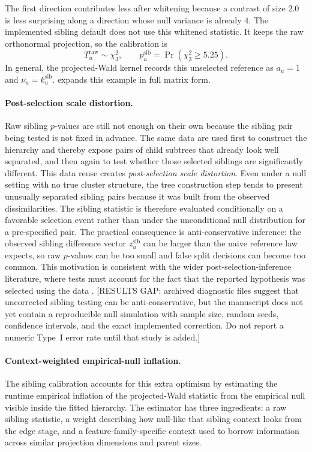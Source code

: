 The first direction contributes less after whitening because a contrast of
size $2.0$ is less surprising along a direction whose null variance is already
$4$. The implemented sibling default does not use this whitened statistic. It
keeps the raw orthonormal projection, so the calibration is
\begin{equation}
T_u^{\mathrm{raw}} \sim \chi^2_3,
\qquad
p_u^{\mathrm{sib}}
=
\Pr\!\left(
\chi^2_3 \ge 5.25
\right).
\end{equation}
In general, the projected-Wald kernel records this unselected reference as
$a_u=1$ and $\nu_u=k_u^{\mathrm{sib}}$. 
expands this example in full matrix form.

\paragraph{Post-selection scale distortion.}
Raw sibling $p$-values are still not enough on their own because the sibling
pair being tested is not fixed in advance. The same data are used first to
construct the hierarchy and thereby expose pairs of child subtrees that already
look well separated, and then again to test whether those selected siblings are
significantly different. This data reuse creates \emph{post-selection
scale distortion}. Even under a null setting with no true cluster structure, the tree
construction step tends to present unusually separated sibling pairs because it
was built from the observed dissimilarities. The sibling statistic
is therefore evaluated conditionally on a favorable selection event rather than
under the unconditional null distribution for a pre-specified pair. The
practical consequence is anti-conservative inference: the observed sibling
difference vector $z_u^{\mathrm{sib}}$ can be larger than the naive reference
law expects, so raw $p$-values can be too small and false split decisions can
become too common. This motivation is consistent with the wider
post-selection-inference literature, where tests must account for the fact
that the reported hypothesis was selected using the data
\citep{fithian2014optimal,lee2016exact,gao2024selective}.
[RESULTS GAP: archived diagnostic files suggest that uncorrected sibling
testing can be anti-conservative, but the manuscript does not yet contain a
reproducible null simulation with sample size, random seeds, confidence
intervals, and the exact implemented correction. Do not report a numeric
Type~I error rate until that study is added.]

\paragraph{Context-weighted empirical-null inflation.}
The sibling calibration accounts for this extra optimism by estimating the
runtime empirical inflation of the projected-Wald statistic from the empirical
null visible inside the fitted hierarchy. The estimator has three ingredients:
a raw sibling statistic, a weight describing how null-like that sibling context
looks from the edge stage, and a feature-family-specific context used to
borrow information across similar projection dimensions and parent sizes.


